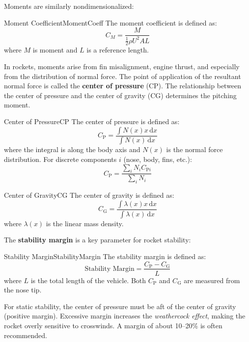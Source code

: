 \documentclass[uplatex,dvipdfmx,a4paper,11pt]{report}
\newcommand{\keyword}[1]{\textcolor{mainblue}{\textbf{#1}}}
\newcommand{\diff}{\mathrm{d}} %
\numberwithin{equation}{chapter}
\begin{document}
\enskip

Moments are similarly nondimensionalized:
\begin{definition}{Moment Coefficient}{MomentCoeff}{}
  The moment coefficient is defined as:
  \begin{equation}
    C_M = \frac{M}{\frac{1}{2}\rho U^{2}A L}
  \end{equation}
  where $M$ is moment and $L$ is a reference length.
\end{definition}

In rockets, moments arise from fin misalignment, engine thrust, and especially from the distribution of normal force. The point of application of the resultant normal force is called the \keyword{center of pressure} (CP). The relationship between the center of pressure and the center of gravity (CG) determines the pitching moment.
\begin{definition}{Center of Pressure}{CP}{}
  The center of pressure is defined as:
  \begin{equation}
    C_\mathrm{P} = \frac{\int N(x)x\,\diff x}{\int N(x)\,\diff x}
  \end{equation}
  where the integral is along the body axis and $N(x)$ is the normal force distribution. For discrete components $i$ (nose, body, fins, etc.):
  \begin{equation}
    C_\mathrm{P} = \frac{\sum_i N_i C_{\mathrm{P}i}}{\sum_i N_i}
  \end{equation}
\end{definition}

\begin{remark}{Center of Gravity}{CG}{}
  The center of gravity is defined as:
  \begin{equation}
    C_\mathrm{G} = \frac{\int \lambda(x)x\,\diff x}{\int \lambda(x)\,\diff x}
  \end{equation}
  where $\lambda(x)$ is the linear mass density.
\end{remark}

The \keyword{stability margin} is a key parameter for rocket stability:
\begin{definition}{Stability Margin}{StabilityMargin}{}
  The stability margin is defined as:
  \begin{equation}
    \text{Stability Margin} = \frac{C_\mathrm{P} - C_\mathrm{G}}{L}
  \end{equation}
  where $L$ is the total length of the vehicle. Both $C_\mathrm{P}$ and $C_\mathrm{G}$ are measured from the nose tip.
\end{definition}
For static stability, the center of pressure must be aft of the center of gravity (positive margin). Excessive margin increases the \emph{weathercock effect}, making the rocket overly sensitive to crosswinds. A margin of about 10--20\% is often recommended.
\end{document}
